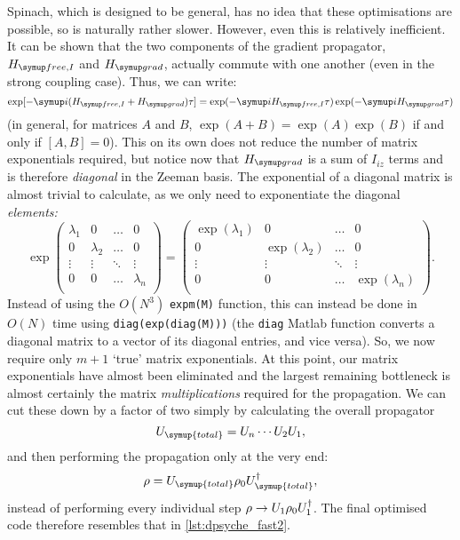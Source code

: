 Spinach, which is designed to be general, has no idea that these optimisations are possible, so is naturally rather slower.
However, even this is relatively inefficient.
It can be shown that the two components of the gradient propagator, $\HfreeI$ and $\Hgrad$, actually commute with one another (even in the strong coupling case).
Thus, we can write:
\begin{equation}
    \label{eq:split_propagator}
    \exp[-\mi(\HfreeI + \Hgrad)\tau] = \exp(-\mi\HfreeI\tau) \exp(-\mi\Hgrad\tau)
\end{equation}
(in general, for matrices $A$ and $B$, $\exp(A + B) = \exp(A)\exp(B)$ if and only if $[A, B] = 0$).
This on its own does not reduce the number of matrix exponentials required, but notice now that $\Hgrad$ is a sum of $I_{iz}$ terms and is therefore \textit{diagonal} in the Zeeman basis.
The exponential of a diagonal matrix is almost trivial to calculate, as we only need to exponentiate the diagonal \textit{elements:}
\begin{equation}
    \label{eq:expm_diagonal}
    \exp
    \begin{pmatrix}
        \lambda_1 & 0 & \ldots & 0 \\
        0 & \lambda_2 & \ldots & 0 \\
        \vdots & \vdots & \ddots & \vdots \\
        0 & 0 & \ldots & \lambda_n \\
    \end{pmatrix}
    = 
    \begin{pmatrix}
        \exp(\lambda_1) & 0 & \ldots & 0 \\
        0 & \exp(\lambda_2) & \ldots & 0 \\
        \vdots & \vdots & \ddots & \vdots \\
        0 & 0 & \ldots & \exp(\lambda_n) \\
    \end{pmatrix}.
\end{equation}
Instead of using the $O(N^3)$ \texttt{expm(M)} function, this can instead be done in $O(N)$ time using \texttt{diag(exp(diag(M)))} (the \texttt{diag} Matlab function converts a diagonal matrix to a vector of its diagonal entries, and vice versa).
So, we now require only $m + 1$ `true' matrix exponentials.
At this point, our matrix exponentials have almost been eliminated and the largest remaining bottleneck is almost certainly the matrix \textit{multiplications} required for the propagation.
We can cut these down by a factor of two simply by calculating the overall propagator
\begin{equation}
    \label{eq:overall_propagator}
    U_{\symup{total}} = U_n\cdots U_2U_1,
\end{equation}
and then performing the propagation only at the very end:
\begin{equation}
    \label{eq:overall_propagation}
    \rho = U_{\symup{total}} \rho_0 \adj{U_{\symup{total}}},
\end{equation}
instead of performing every individual step $\rho \to U_1\rho_0U_1^\dagger$.
The final optimised code therefore resembles that in \cref{lst:dpsyche_fast2}.

